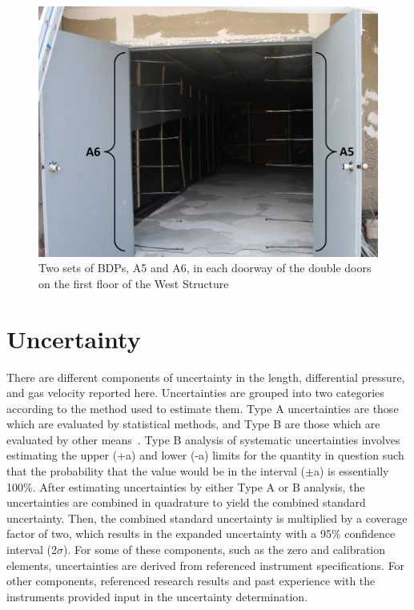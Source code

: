 \documentclass[12pt,oneside]{book}
\begin{document}
\begin{figure}[!ht]
\includegraphics[width=6in]{../Pictures/BDPs}
\caption[Two sets of BDPs in Doorway of West Structure]{Two sets of BDPs, A5 and A6, in each doorway of the double doors on the first floor of the West Structure}
\label{fig:BDPs}
\end{figure}

\section{Uncertainty}
\label{sec:Uncertainty}
There are different components of uncertainty in the length, differential pressure, and gas velocity reported here. Uncertainties are grouped into two categories according to the method used to estimate them. Type A uncertainties are those which are evaluated by statistical methods, and Type B are those which are evaluated by other means~\cite{Taylor&Kuyatt:1994}. Type B analysis of systematic uncertainties involves estimating the upper (+a) and lower (-a) limits for the quantity in question such that the probability that the value would be in the interval ($\pm$a) is essentially 100\%. After estimating uncertainties by either Type A or B analysis, the uncertainties are combined in quadrature to yield the combined standard uncertainty. Then, the combined standard uncertainty is multiplied by a coverage factor of two, which results in the expanded uncertainty with a 95\% confidence interval (2$\sigma$). For some of these components, such as the zero and calibration elements, uncertainties are derived from referenced instrument specifications. For other components, referenced research results and past experience with the instruments provided input in the uncertainty determination. 
\end{document}
